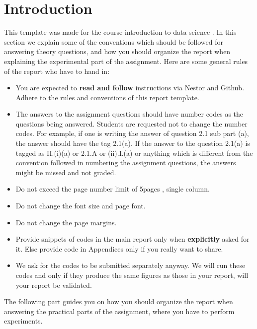 
\section*{Introduction}
This template was made for the course introduction to data science \cite{IDS2017}. 
In this section we explain some of the conventions which should be followed for answering theory questions, and how you should organize the report when explaining the experimental part of the 
assignment. Here are some general rules of the report who have to hand in:
\begin{itemize}
 \item You are expected to \textbf{read and follow} instructions via Nestor and Github. Adhere to the rules and conventions of this report template.
 \item The answers to the assignment questions should have number codes as the questions being answered. Students are requested not to change the number codes. For example, if one is writing the 
answer of question 2.1 sub part (a), the answer should have the tag 2.1(a). If the answer to the question 2.1(a) is tagged as II.(i)(a) or 2.1.A or (ii).I.(a) or anything which is different 
from the convention followed in numbering the assignment questions, the answers might be missed and not graded.
\item Do not exceed the page number limit of 5pages , single column.
\item Do not change the font size and page font.
\item Do not change the page margins.
\item Provide snippets of codes in the main report only when \textbf{explicitly} asked for it. Else provide code in Appendices only if you really want to share. 
\item We ask for the codes to be submitted separately anyway. We will run these codes and only if they produce the same figures as those in your report, will your report be validated.
\end{itemize}
The following part guides you on how you should organize the report when answering the practical parts of the assignment, where you have to perform experiments.
